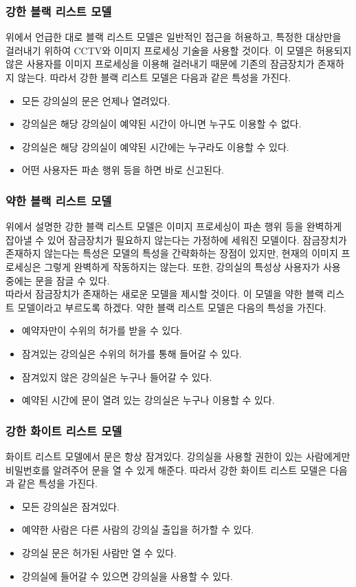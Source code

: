 \documentclass[11pt,a4paper]{article}
\begin{document}
\subsubsection{강한 블랙 리스트 모델}
위에서 언급한 대로 블랙 리스트 모델은 일반적인 접근을 허용하고, 특정한 대상만을 걸러내기 위하여 CCTV와 이미지 프로세싱 기술을 사용할 것이다. 이 모델은 허용되지 않은 사용자를 이미지 프로세싱을 이용해 걸러내기 때문에 기존의 잠금장치가 존재하지 않는다. 따라서 강한 블랙 리스트 모델은 다음과 같은 특성을 가진다.
\begin{itemize}
\item 모든 강의실의 문은 언제나 열려있다.
\item 강의실은 해당 강의실이 예약된 시간이 아니면 누구도 이용할 수 없다.
\item 강의실은 해당 강의실이 예약된 시간에는 누구라도 이용할 수 있다.
\item 어떤 사용자든 파손 행위 등을 하면 바로 신고된다.
\end{itemize}

\subsubsection{약한 블랙 리스트 모델}
위에서 설명한 강한 블랙 리스트 모델은 이미지 프로세싱이 파손 행위 등을 완벽하게 잡아낼 수 있어 잠금장치가 필요하지 않는다는 가정하에 세워진 모델이다. 잠금장치가 존재하지 않는다는 특성은 모델의 특성을 간략화하는 장점이 있지만, 현재의 이미지 프로세싱은 그렇게 완벽하게 작동하지는 않는다. 또한, 강의실의 특성상 사용자가 사용 중에는 문을 잠글 수 있다.\\
따라서 잠금장치가 존재하는 새로운 모델을 제시할 것이다. 이 모델을 약한 블랙 리스트 모델이라고 부르도록 하겠다. 약한 블랙 리스트 모델은 다음의 특성을 가진다.
\begin{itemize}
\item 예약자만이 수위의 허가를 받을 수 있다.
\item 잠겨있는 강의실은 수위의 허가를 통해 들어갈 수 있다.
\item 잠겨있지 않은 강의실은 누구나 들어갈 수 있다.
\item 예약된 시간에 문이 열려 있는 강의실은 누구나 이용할 수 있다.
\end{itemize}

\subsubsection{강한 화이트 리스트 모델}
화이트 리스트 모델에서 문은 항상 잠겨있다. 강의실을 사용할 권한이 있는 사람에게만 비밀번호를 알려주어 문을 열 수 있게 해준다. 따라서 강한 화이트 리스트 모델은 다음과 같은 특성을 가진다.
\begin{itemize}
\item 모든 강의실은 잠겨있다.
\item 예약한 사람은 다른 사람의 강의실 출입을 허가할 수 있다.
\item 강의실 문은 허가된 사람만 열 수 있다.
\item 강의실에 들어갈 수 있으면 강의실을 사용할 수 있다.
\end{itemize}
\end{document}
